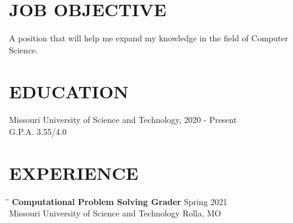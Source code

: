 \documentclass{res}
\begin{document}
 


\address{\bf  ADDRESS\\1310 N Pine Street\\Rolla, MO 654501\\(636) 730-8032}
                                  
\begin{resume}

\section{JOB OBJECTIVE}          
    A position that will help me expand my knowledge in the field
    of Computer Science.
 
\section{EDUCATION}          
    Missouri University of Science and Technology, 2020 - Present\\        
    G.P.A. 3.55/4.0          

 
\section{EXPERIENCE}
   \vspace{-0.1in}	
   \begin{tabbing}
   \hspace{2.3in}\= \hspace{2.6in}\= \kill %
    {\bf Computational Problem Solving Grader} \>  \>Spring 2021\\
    		Missouri University of Science and Technology\>\> Rolla, MO\\
                             

\end{tabbing}
\end{resume}
\end{document}
